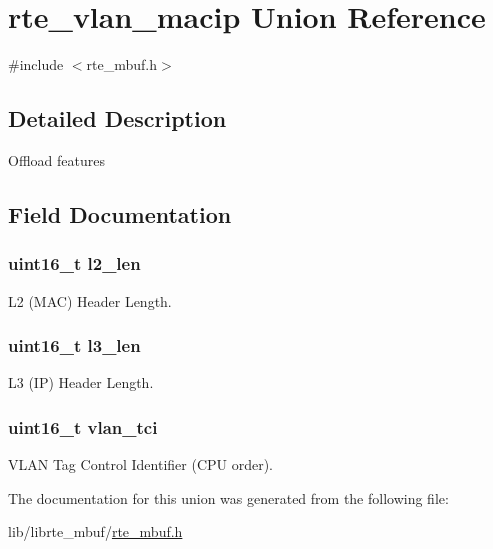 \hypertarget{unionrte__vlan__macip}{}\section{rte\+\_\+vlan\+\_\+macip Union Reference}
\label{unionrte__vlan__macip}


{\ttfamily \#include $<$rte\+\_\+mbuf.\+h$>$}



\subsection{Detailed Description}
Offload features 

\subsection{Field Documentation}
\hypertarget{unionrte__vlan__macip_af645f2e9d2c6b6bd3b4a6b37b9800287}{}
\subsubsection[{l2\+\_\+len}]{\setlength{\rightskip}{0pt plus 5cm}uint16\+\_\+t l2\+\_\+len}\label{unionrte__vlan__macip_af645f2e9d2c6b6bd3b4a6b37b9800287}
L2 (M\+A\+C) Header Length. \hypertarget{unionrte__vlan__macip_a36362b3f63b522155ebf6f2a6aff2b01}{}
\subsubsection[{l3\+\_\+len}]{\setlength{\rightskip}{0pt plus 5cm}uint16\+\_\+t l3\+\_\+len}\label{unionrte__vlan__macip_a36362b3f63b522155ebf6f2a6aff2b01}
L3 (I\+P) Header Length. \hypertarget{unionrte__vlan__macip_a466610c1a1f26aace575dc4dc60d81b3}{}
\subsubsection[{vlan\+\_\+tci}]{\setlength{\rightskip}{0pt plus 5cm}uint16\+\_\+t vlan\+\_\+tci}\label{unionrte__vlan__macip_a466610c1a1f26aace575dc4dc60d81b3}
V\+L\+A\+N Tag Control Identifier (C\+P\+U order). 

The documentation for this union was generated from the following file\+:\begin{DoxyCompactItemize}
\item 
lib/librte\+\_\+mbuf/\hyperlink{rte__mbuf_8h}{rte\+\_\+mbuf.\+h}\end{DoxyCompactItemize}
